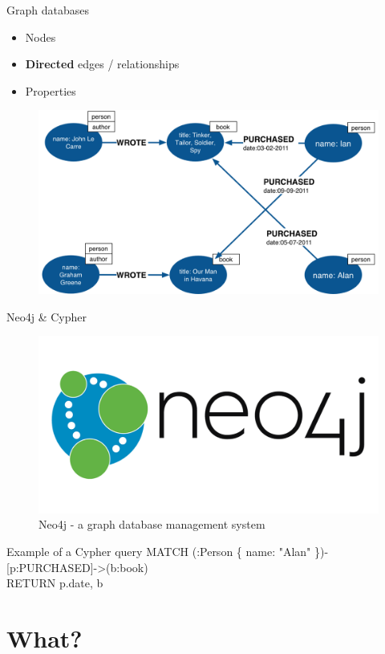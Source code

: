 \documentclass{beamer}
\begin{document}
\begin{frame}{Graph databases}
    \begin{itemize}
        \item Nodes
        \item \textbf{Directed} edges / relationships
        \item Properties
    \end{itemize}
    \begin{figure}
        \centering
        \includegraphics[width=0.75\linewidth]{graph_database.png}
    \end{figure}
\end{frame}

\begin{frame}{Neo4j \& Cypher}
\begin{figure}
    \centering
    \includegraphics[width=0.5\linewidth]{neo4j_logo.png}
    \caption{Neo4j - a graph database management system}
\end{figure}
\begin{block}{Example of a Cypher query}
MATCH (:Person \{ name: "Alan" \})-[p:PURCHASED]-\textgreater(b:book) \\
RETURN p.date, b
\end{block}
\end{frame}


\section{What?}
\end{document}
